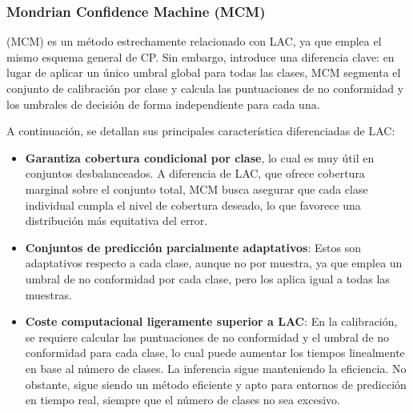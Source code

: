 

\subsubsection{Mondrian Confidence Machine (MCM)}

(MCM) \cite{vovk2003} es un método estrechamente relacionado con LAC, ya que emplea el mismo esquema general 
de CP. Sin embargo, introduce una diferencia clave: en lugar de aplicar un único umbral global para todas las 
clases, MCM segmenta el conjunto de calibración por clase y calcula las puntuaciones de no conformidad y los 
umbrales de decisión de forma independiente para cada una.

A continuación, se detallan sus principales característica diferenciadas de LAC:

\begin{itemize}

    \item \textbf{Garantiza cobertura condicional por clase}, lo cual es muy útil en conjuntos desbalanceados.
    A diferencia de LAC, que ofrece cobertura marginal sobre el conjunto total, MCM busca asegurar que cada
    clase individual cumpla el nivel de cobertura deseado, lo que favorece una distribución más equitativa 
    del error.
    
    \item \textbf{Conjuntos de predicción parcialmente adaptativos}: Estos son adaptativos respecto a cada 
    clase, aunque no por muestra, ya que emplea un umbral de no conformidad por cada clase, pero los aplica
    igual a todas las muestras.  

    \item \textbf{Coste computacional ligeramente superior a LAC}: En la calibración, se requiere calcular 
    las puntuaciones de no conformidad y el umbral de no conformidad para cada clase, lo cual puede aumentar 
    los tiempos linealmente en base al número de clases. La inferencia sigue manteniendo la eficiencia.
    No obstante, sigue siendo un método eficiente y apto 
    para entornos de predicción en tiempo real, siempre que el número de clases no sea excesivo.

\end{itemize}



